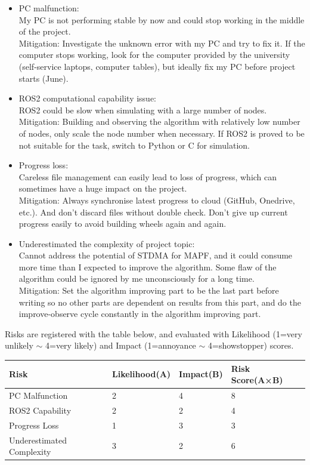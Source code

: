 \documentclass[12pt, oneside]{article}
\begin{document}
\begin{itemize}
    \item PC malfunction: 
    \\My PC is not performing stable by now and could stop working in the middle of the project.
    \\Mitigation: Investigate the unknown error with my PC and try to fix it. If the computer stops working, look for the computer provided by the university (self-service laptops, computer tables), but ideally fix my PC before project starts (June).
    \item ROS2 computational capability issue:
    \\ROS2 could be slow when simulating with a large number of nodes. 
    \\Mitigation: Building and observing the algorithm with relatively low number of nodes, only scale the node number when necessary. If ROS2 is proved to be not suitable for the task, switch to Python or C for simulation.
    \item Progress loss:
    \\Careless file management can easily lead to loss of progress, which can sometimes have a huge impact on the project.
    \\Mitigation: Always synchronise latest progress to cloud (GitHub, Onedrive, etc.). And don't discard files without double check. Don’t give up current progress easily to avoid building wheels again and again.
    \item Underestimated the complexity of project topic:
    \\Cannot address the potential of STDMA for MAPF, and it could consume more time than I expected to improve the algorithm. Some flaw of the algorithm could be ignored by me unconsciously for a long time.
    \\Mitigation: Set the algorithm improving part to be the last part before writing so no other parts are dependent on results from this part, and do the improve-observe cycle constantly in the algorithm improving part.
\end{itemize}

Risks are registered with the table below, and evaluated with Likelihood (1=very unlikely $\sim$ 4=very likely) and Impact (1=annoyance $\sim$ 4=showstopper) scores.

\begin{table}[]
\begin{tabular}{|l|l|l|l|}
\hline
Risk                      & Likelihood(A) & Impact(B) & Risk Score(A×B) \\ \hline
PC Malfunction            & 2             & 4         & 8               \\ \hline
ROS2 Capability           & 2             & 2         & 4               \\ \hline
Progress Loss             & 1             & 3         & 3               \\ \hline
Underestimated Complexity & 3             & 2         & 6               \\ \hline
\end{tabular}
\end{table}
\end{document}
